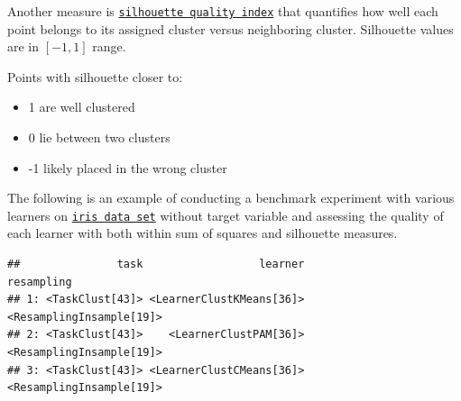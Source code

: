 \documentclass[
]{scrbook}
\newenvironment{Shaded}{\begin{snugshade}}{\end{snugshade}}
\newcommand{\AttributeTok}[1]{\textcolor[rgb]{0.77,0.63,0.00}{#1}}
\newcommand{\DecValTok}[1]{\textcolor[rgb]{0.00,0.00,0.81}{#1}}
\newcommand{\FunctionTok}[1]{\textcolor[rgb]{0.00,0.00,0.00}{#1}}
\newcommand{\NormalTok}[1]{#1}
\newcommand{\OtherTok}[1]{\textcolor[rgb]{0.56,0.35,0.01}{#1}}
\newcommand{\SpecialCharTok}[1]{\textcolor[rgb]{0.00,0.00,0.00}{#1}}
\newcommand{\StringTok}[1]{\textcolor[rgb]{0.31,0.60,0.02}{#1}}
\providecommand{\tightlist}{%
  \setlength{\itemsep}{0pt}\setlength{\parskip}{0pt}}
\renewenvironment{Shaded} {\begin{snugshade}\small} {\end{snugshade}}
\begin{document}
Another measure is \href{https://mlr3cluster.mlr-org.com/reference/mlr_measures_clust.silhouette.html}{\texttt{silhouette\ quality\ index}} that quantifies how well each point belongs to its assigned cluster versus neighboring cluster.
Silhouette values are in \([-1, 1]\) range.

Points with silhouette closer to:

\begin{itemize}
\tightlist
\item
  1 are well clustered
\item
  0 lie between two clusters
\item
  -1 likely placed in the wrong cluster
\end{itemize}

The following is an example of conducting a benchmark experiment with various learners on \href{https://mlr3.mlr-org.com/reference/mlr_tasks_iris.html}{\texttt{iris\ data\ set}} without target variable and assessing the quality of each learner with both within sum of squares and silhouette measures.

\begin{Shaded}
\end{Shaded}

\begin{verbatim}
##               task                  learner               resampling
## 1: <TaskClust[43]> <LearnerClustKMeans[36]> <ResamplingInsample[19]>
## 2: <TaskClust[43]>    <LearnerClustPAM[36]> <ResamplingInsample[19]>
## 3: <TaskClust[43]> <LearnerClustCMeans[36]> <ResamplingInsample[19]>
\end{verbatim}
\end{document}
